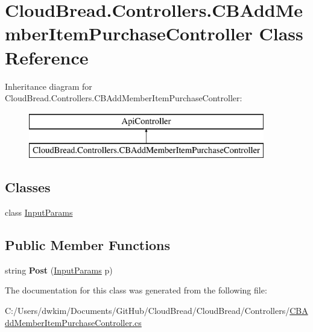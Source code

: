 \hypertarget{class_cloud_bread_1_1_controllers_1_1_c_b_add_member_item_purchase_controller}{}\section{Cloud\+Bread.\+Controllers.\+C\+B\+Add\+Member\+Item\+Purchase\+Controller Class Reference}
\label{class_cloud_bread_1_1_controllers_1_1_c_b_add_member_item_purchase_controller}
Inheritance diagram for Cloud\+Bread.\+Controllers.\+C\+B\+Add\+Member\+Item\+Purchase\+Controller\+:\begin{figure}[H]
\begin{center}
\leavevmode
\includegraphics[height=2.000000cm]{class_cloud_bread_1_1_controllers_1_1_c_b_add_member_item_purchase_controller}
\end{center}
\end{figure}
\subsection*{Classes}
\begin{DoxyCompactItemize}
\item 
class \hyperlink{class_cloud_bread_1_1_controllers_1_1_c_b_add_member_item_purchase_controller_1_1_input_params}{Input\+Params}
\end{DoxyCompactItemize}
\subsection*{Public Member Functions}
\begin{DoxyCompactItemize}
\item 
string {\bfseries Post} (\hyperlink{class_cloud_bread_1_1_controllers_1_1_c_b_add_member_item_purchase_controller_1_1_input_params}{Input\+Params} p)\hypertarget{class_cloud_bread_1_1_controllers_1_1_c_b_add_member_item_purchase_controller_ae2853526a3a3167600fc4fb9e0e5d8f1}{}\label{class_cloud_bread_1_1_controllers_1_1_c_b_add_member_item_purchase_controller_ae2853526a3a3167600fc4fb9e0e5d8f1}

\end{DoxyCompactItemize}


The documentation for this class was generated from the following file\+:\begin{DoxyCompactItemize}
\item 
C\+:/\+Users/dwkim/\+Documents/\+Git\+Hub/\+Cloud\+Bread/\+Cloud\+Bread/\+Controllers/\hyperlink{_c_b_add_member_item_purchase_controller_8cs}{C\+B\+Add\+Member\+Item\+Purchase\+Controller.\+cs}\end{DoxyCompactItemize}
